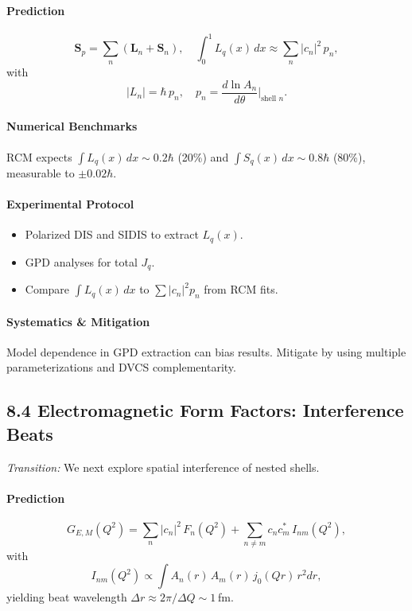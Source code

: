 \paragraph{Prediction}  
\[
\mathbf S_p = \sum_n (\mathbf L_n + \mathbf S_n),
\quad
\int_0^1 L_q(x)\,dx \approx \sum_n |c_n|^2\,p_n,
\]
with
\begin{equation}\label{eq:spin_shell}
|L_n| = \hbar\,p_n,
\quad
p_n = \frac{d\ln A_n}{d\theta}\Big|_{\text{shell }n}.
\end{equation}

\paragraph{Numerical Benchmarks}  
RCM expects \(\int L_q(x)\,dx\sim0.2\hbar\) (20\%) and \(\int S_q(x)\,dx\sim0.8\hbar\) (80\%), measurable to \(\pm0.02\hbar\).

\paragraph{Experimental Protocol}  
\begin{itemize}
  \item Polarized DIS and SIDIS to extract \(L_q(x)\).  
  \item GPD analyses for total \(J_q\).  
  \item Compare \(\int L_q(x)\,dx\) to \(\sum |c_n|^2 p_n\) from RCM fits.
\end{itemize}

\paragraph{Systematics \& Mitigation}  
Model dependence in GPD extraction can bias results.  Mitigate by using multiple parameterizations and DVCS complementarity.

\subsection{8.4 Electromagnetic Form Factors: Interference Beats}  
\emph{Transition:} We next explore spatial interference of nested shells.

\paragraph{Prediction}  
\[
G_{E,M}(Q^2)=\sum_n |c_n|^2\,F_n(Q^2)
+ \sum_{n\neq m}c_n c_m^*\,I_{nm}(Q^2),
\]
with
\begin{equation}\label{eq:form_beats}
I_{nm}(Q^2)\propto \int A_n(r)\,A_m(r)\,j_0(Qr)\,r^2 dr,
\end{equation}
yielding beat wavelength \(\Delta r\approx2\pi/\Delta Q\sim1\) fm.

